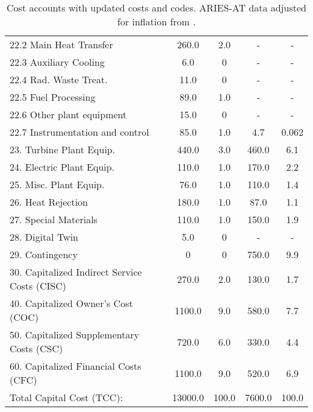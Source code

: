 \begin{table}[h!]
{\begin{tabular}{lcccc}
\hspace{10mm}22.2 Main Heat Transfer & 260.0 & 2.0 & - & - \\
\hspace{10mm}22.3 Auxiliary Cooling & 6.0 & 0 & - & - \\
\hspace{10mm}22.4 Rad. Waste Treat. & 11.0 & 0 & - & - \\
\hspace{10mm}22.5 Fuel Processing & 89.0 & 1.0 & - & - \\
\hspace{10mm}22.6 Other plant equipment & 15.0 & 0 & - & - \\
\hspace{10mm}22.7 Instrumentation and control & 85.0 & 1.0 & 4.7 & 0.062 \\
\hspace{5mm}23. Turbine Plant Equip. & 440.0 & 3.0 & 460.0 & 6.1 \\
\hspace{5mm}24. Electric Plant Equip. & 110.0 & 1.0 & 170.0 & 2.2 \\
\hspace{5mm}25. Misc. Plant Equip. & 76.0 & 1.0 & 110.0 & 1.4 \\
\hspace{5mm}26. Heat Rejection & 180.0 & 1.0 & 87.0 & 1.1 \\
\hspace{5mm}27. Special Materials & 110.0 & 1.0 & 150.0 & 1.9 \\
\hspace{5mm}28. Digital Twin & 5.0 & 0 & - & - \\
\hspace{5mm}29. Contingency & 0 & 0 & 750.0 & 9.9 \\
30. Capitalized Indirect Service Costs (CISC) & 270.0 & 2.0 & 130.0 & 1.7 \\
40. Capitalized Owner’s Cost (COC) & 1100.0 & 9.0 & 580.0 & 7.7 \\
50. Capitalized Supplementary Costs (CSC) & 720.0 & 6.0 & 330.0 & 4.4 \\
60. Capitalized Financial Costs (CFC) & 1100.0 & 9.0 & 520.0 & 6.9 \\
\hline
Total Capital Cost (TCC): & 13000.0 & 100.0 & 7600.0 & 100.0 \\
\hline
\end{tabular}
}
\caption{Cost accounts with updated costs and codes. ARIES-AT data adjusted for inflation from \cite{gordon1986mirror}.}
\label{tab:costs_updated_codes}
\end{table}


